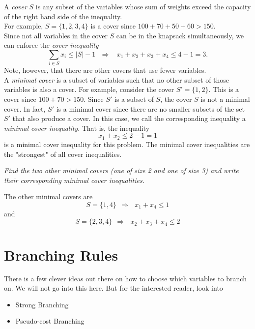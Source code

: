 A \emph{cover} $S$ is any subset of the variables whose sum of weights exceed the capacity of the right hand side of the inequality.\\
For example, $S = \{1,2,3,4\}$ is a cover since $100 + 70 + 50 + 60 > 150$.\\
Since not all variables in the cover $S$ can be in the knapsack simultaneously, we can enforce the \emph{cover inequality}
\begin{equation}
\sum_{i \in S} x_i \leq |S| - 1 \ \ \ \Rightarrow \ \ \ \ x_1 + x_2 + x_3 + x_4 \leq 4 - 1 = 3.
\end{equation}
Note, however, that there are other covers that use fewer variables.\\

A \emph{minimal cover} is a subset of variables such that no other subset of those variables is also a cover.  For example, consider the cover $S' = \{1,2\}$.  This is a cover since $100 + 70 > 150$.  Since $S'$ is a subset of $S$, the cover $S$ is not a minimal cover.  In fact, $S'$ is a minimal cover since there are no smaller subsets of the set $S'$ that also produce a cover.
In this case, we call the corresponding inequality a \emph{minimal cover inequality}.  That is, the inequality
\begin{equation}
x_1 + x_2 \leq 2 - 1 = 1
\end{equation}
is a minimal cover inequality for this problem.   The minimal cover inequalities are the "strongest" of all cover inequalities.

\emph{Find the two other minimal covers (one of size 2 and one of size 3) and write their corresponding minimal cover inequalities.}

\begin{solution}{}{}{}
The other minimal covers are 
\begin{equation}
S = \{1,4\} \ \ \Rightarrow \ \ \ x_1 + x_4 \leq 1
\end{equation}
and
\begin{equation}
S = \{2,3,4\} \ \ \Rightarrow \ \ \ x_2 + x_3 + x_4 \leq 2
\end{equation}
\end{solution}


\section{Branching Rules}
There is a few clever ideas out there on how to choose which variables to branch on.  We will not go into this here.  But for the interested reader, look into 
\begin{itemize}
\item Strong Branching
\item Pseudo-cost Branching
\end{itemize}

